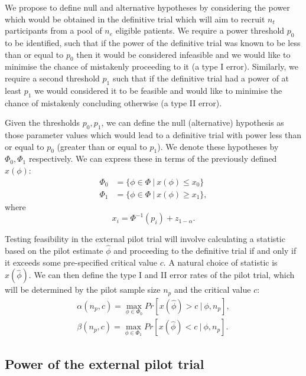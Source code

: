 \documentclass{article}
\begin{document}
We propose to define null and alternative hypotheses by considering the power which would be obtained in the definitive trial which will aim to recruit $n_t$ participants from a pool of $n_e$ eligible patients. We require a power threshold $p_0$ to be identified, such that if the power of the definitive trial was known to be less than or equal to $p_0$ then it would be considered infeasible and we would like to minimise the chance of mistakenly proceeding to it (a type I error). Similarly, we require a second threshold $p_1$ such that if the definitive trial had a  power of at least $p_1$ we would considered it to be feasible and would like to minimise the chance of mistakenly concluding otherwise (a type II error). 

Given the thresholds $p_0, p_1$, we can define the null (alternative) hypothesis as those parameter values which would lead to a definitive trial with power less than or equal to $p_0$ (greater than or equal to $p_1$). We denote these hypotheses by $\Phi_0, \Phi_1$ respectively. We can express these in terms of the previously defined $x(\phi)$:
\begin{align*}
\Phi_0 &= \{\phi \in \Phi ~ | ~ x(\phi) \leq x_0 \} \\
\Phi_1 &= \{\phi \in \Phi ~ | ~ x(\phi) \geq x_1 \},
\end{align*}
where
$$
x_i = \Phi^{-1}(p_i) + z_{1-\alpha}.
$$

Testing feasibility in the external pilot trial will involve calculating a statistic based on the pilot estimate $\hat{\phi}$ and proceeding to the definitive trial if and only if it exceeds some pre-specified critical value $c$. A natural choice of statistic is $x(\hat{\phi})$. We can then define the type I and II error rates of the pilot trial, which will be determined by the pilot sample size $n_p$ and the critical value $c$:
\begin{align*}
\alpha(n_p, c) = \max_{\phi \in \Phi_0} Pr[ x(\hat{\phi}) > c ~ | ~ \phi, n_p], \\
\beta(n_p, c) = \max_{\phi \in \Phi_1} Pr[ x(\hat{\phi}) < c ~ | ~ \phi, n_p].
\end{align*}

\subsection{Power of the external pilot trial}
\end{document}
